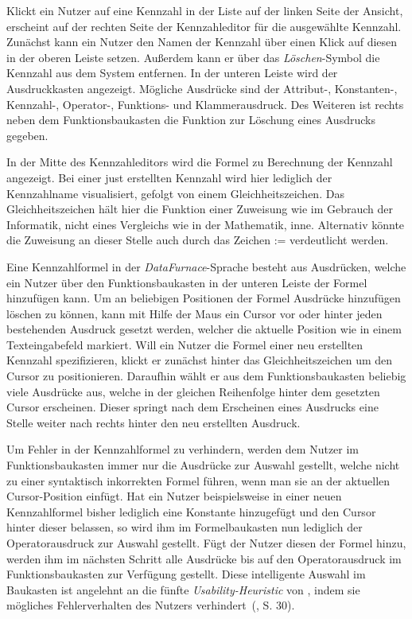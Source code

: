 \documentclass[
  language=german, %
  type=bachelor%
]{isthesis}
\begin{document}
\begin{content}
  Klickt ein Nutzer auf eine Kennzahl in der Liste auf der linken Seite der
  Ansicht, erscheint auf der rechten Seite der Kennzahleditor für die
  ausgewählte Kennzahl. Zunächst kann ein Nutzer den Namen der Kennzahl über
  einen Klick auf diesen in der oberen Leiste setzen. Außerdem kann er über das
  \textit{Löschen}-Symbol die Kennzahl aus dem System entfernen. In der unteren
  Leiste wird der Ausdruckkasten angezeigt. Mögliche Ausdrücke sind der
  \mbox{Attribut-,} \mbox{Konstanten-,} \mbox{Kennzahl-,} \mbox{Operator-,}
  Funktions- und Klammerausdruck.  Des Weiteren ist rechts neben dem
  Funktionsbaukasten die Funktion zur Löschung eines Ausdrucks gegeben.

  In der Mitte des Kennzahleditors wird die Formel zu Berechnung der Kennzahl
  angezeigt. Bei einer just erstellten Kennzahl wird hier lediglich der
  Kennzahlname visualisiert, gefolgt von einem Gleichheitszeichen. Das
  Gleichheitszeichen hält hier die Funktion einer Zuweisung wie im Gebrauch
  der Informatik, nicht eines Vergleichs wie in der Mathematik, inne.
  Alternativ könnte die Zuweisung an dieser Stelle auch durch das Zeichen
  \mbox{:=} verdeutlicht werden. 
  
  Eine Kennzahlformel in der \textit{DataFurnace}-Sprache besteht aus
  Ausdrücken, welche ein Nutzer über den Funktionsbaukasten in der unteren
  Leiste der Formel hinzufügen kann. Um an beliebigen Positionen der Formel
  Ausdrücke hinzufügen \bzw{} löschen zu können, kann mit Hilfe der Maus ein
  Cursor vor oder hinter jeden bestehenden Ausdruck gesetzt werden, welcher die
  aktuelle Position wie in einem Texteingabefeld markiert. Will ein Nutzer die
  Formel einer neu erstellten Kennzahl spezifizieren, klickt er zunächst hinter
  das Gleichheitszeichen um den Cursor zu positionieren.  Daraufhin wählt er
  aus dem Funktionsbaukasten beliebig viele Ausdrücke aus, welche in der
  gleichen Reihenfolge hinter dem gesetzten Cursor erscheinen.  Dieser springt
  nach dem Erscheinen eines Ausdrucks eine Stelle weiter nach rechts hinter den
  neu erstellten Ausdruck. 

  Um Fehler in der Kennzahlformel zu verhindern, werden dem Nutzer im
  Funktionsbaukasten immer nur die Ausdrücke zur Auswahl gestellt, welche nicht
  zu einer syntaktisch inkorrekten Formel führen, wenn man sie an der aktuellen
  Cursor-Position einfügt. Hat ein Nutzer beispielsweise in einer neuen
  Kennzahlformel bisher lediglich eine Konstante hinzugefügt und den Cursor
  hinter dieser belassen, so wird ihm im Formelbaukasten nun lediglich der
  Operatorausdruck zur Auswahl gestellt. Fügt der Nutzer diesen der Formel
  hinzu, werden ihm im nächsten Schritt alle Ausdrücke bis auf den
  Operatorausdruck im Funktionsbaukasten zur Verfügung gestellt. Diese
  intelligente Auswahl im Baukasten ist angelehnt an die fünfte
  \textit{Usability-Heuristic} von \textsc{\citeauthor{nielsen1994heuristic}},
  indem sie mögliches Fehlerverhalten des Nutzers
  verhindert~(\citeyear{nielsen1994heuristic}, S. 30).


\end{content}
\end{document}
